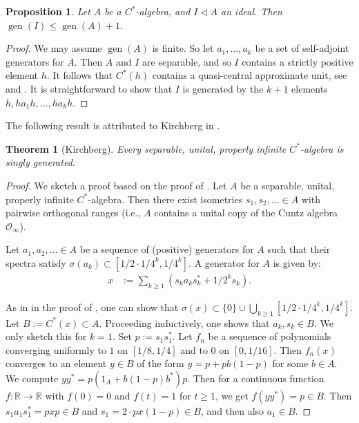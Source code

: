 \documentclass{amsart}
\newtheorem{thm}[thmCt]{Theorem}
\newtheorem{prop}[propCt]{Proposition}
\theoremstyle{definition}
\begin{document}
\begin{prop}
\label{prop:Gen_ideal}
    Let $A$ be a {{$C^*$-al\-ge\-bra}}{}, and $I\lhd A$ an ideal.
    Then $\operatorname{gen}(I)\leq\operatorname{gen}(A)+1$.
\end{prop}
\begin{proof}
    We may assume $\operatorname{gen}(A)$ is finite.
    So let $a_1,\ldots,a_k$ be a set of self-adjoint generators for $A$.
    Then $A$ and $I$ are separable, and so $I$ contains a strictly positive element $h$.
    It follows that $C^*(h)$ contains a quasi-central approximate unit, see \cite[Corollary 3.3]{AkePed1977} and \cite{Arv1977}.
    It is straightforward to show that $I$ is generated by the $k+1$ elements $h,ha_1h,\ldots,ha_kh$.
\end{proof}

\noindent
    The following result is attributed to Kirchberg in \cite{Nag2004}.

\begin{thm}[Kirchberg]
\label{prop:Gen2_prop_inf}
    Every separable, unital, properly infinite {{$C^*$-al\-ge\-bra}}{} is singly generated.
\end{thm}
\begin{proof}
    We sketch a proof based on the proof of \cite[Theorem 9]{OlsZam1976}.
    Let $A$ be a separable, unital, properly infinite {{$C^*$-al\-ge\-bra}}{}.
    Then there exist isometries $s_1,s_2,\ldots\in A$ with pairwise orthogonal ranges (i.e., $A$ contains a unital copy of the Cuntz algebra $\mathcal{O}_\infty$).

    Let $a_1,a_2,\ldots\in A$ be a sequence of (positive) generators for $A$ such that their spectra satisfy $\sigma(a_k)\subset[1/2\cdot 1/4^k,1/4^k]$.
    A generator for $A$ is given by:
    \begin{align*}
        x &:=\sum_{k\geq 1}(s_ka_ks_k^\ast + 1/2^ks_k).
    \end{align*}

    As in in the proof of \cite[Theorem 9]{OlsZam1976}, one can show that $\sigma(x)\subset\{0\}\cup\bigcup_{k\geq 1}[1/2\cdot 1/4^k,1/4^k]$.
    Let $B:=C^*(x)\subset A$.
    Proceeding inductively, one shows that $a_k,s_k\in B$.
    We only sketch this for $k=1$.
    Set $p:=s_1s_1^*$.
    Let $f_n$ be a sequence of polynomials converging uniformly to $1$ on $[1/8,1/4]$ and to $0$ on $[0,1/16]$.
    Then $f_n(x)$ converges to an element $y\in B$ of the form $y=p+pb(1-p)$ for some $b\in A$.
    We compute $yy^*=p(1_A+b(1-p)b^*)p$.
    Then for a continuous function $f\colon{{\mathbb{R}}}\to{{\mathbb{R}}}$ with $f(0)=0$ and $f(t)=1$ for $t\geq 1$, we get $f(yy^*)=p\in B$.
    Then $s_1a_1s_1^*=pxp\in B$ and $s_1=2\cdot px(1-p)\in B$, and then also $a_1\in B$.
\end{proof}
\end{document}
